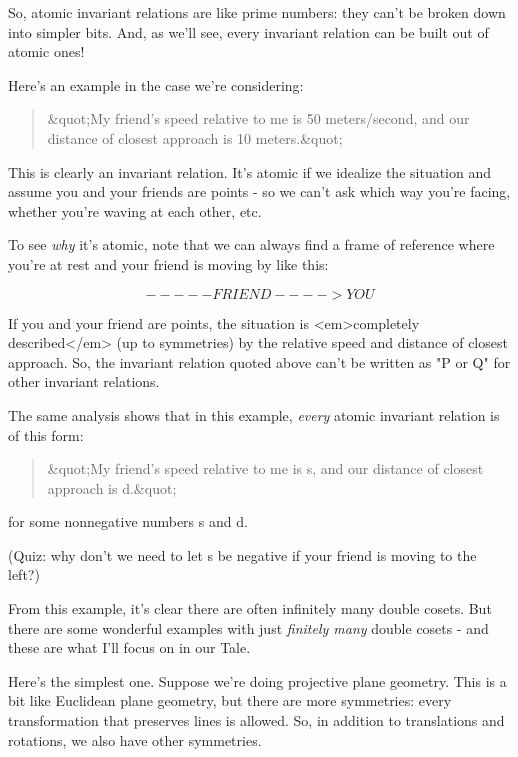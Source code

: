 So, atomic invariant relations are like prime numbers: they can't
be broken down into simpler bits.  And, as we'll see, every invariant
relation can be built out of atomic ones!  

Here's an example in the case we're considering:

\begin{quote}
  &quot;My friend's speed relative to me is 50 meters/second, and our
   distance of closest approach is 10 meters.&quot;
\end{quote}
    

This is clearly an invariant relation.  It's atomic if we idealize 
the situation and assume you and your friends are points - so we 
can't ask which way you're facing, whether you're waving at each other, 
etc.

To see \emph{why} it's atomic, note that we can always find a frame of 
reference where you're at rest and your friend is moving by like this:

$$
              -----FRIEND---->


                    YOU
$$
    
If you and your friend are points, the situation is <em>completely 
described</em> (up to symmetries) by the relative speed and distance 
of closest approach.  So, the invariant relation quoted above 
can't be written as "P or Q" for other invariant relations.  

The same analysis shows that in this example, \emph{every} atomic invariant 
relation is of this form:

\begin{quote}
  &quot;My friend's speed relative to me is s, and our distance of 
  closest approach is d.&quot;
\end{quote}
    

for some nonnegative numbers s and d.

(Quiz: why don't we need to let s be negative if your friend is moving 
to the left?)

From this example, it's clear there are often infinitely many
double cosets.  But there are some wonderful examples with just 
\emph{finitely many} double cosets - and these are what I'll focus
on in our Tale.

Here's the simplest one.  Suppose we're doing projective plane 
geometry.  This is a bit like Euclidean plane geometry, but there are
more symmetries: every transformation that preserves lines is allowed.
So, in addition to translations and rotations, we also have other 
symmetries.  


